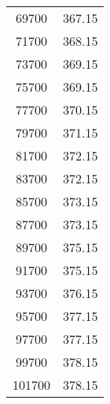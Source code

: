 \begin{longtable}{S S}
         69700  &   367.15 \\
         71700  &   368.15 \\
         73700  &   369.15 \\
         75700  &   369.15 \\
         77700  &   370.15 \\
         79700  &   371.15 \\
         81700  &   372.15 \\
         83700  &   372.15 \\
         85700  &   373.15 \\
         87700  &   373.15 \\
         89700  &   375.15 \\
         91700  &   375.15 \\
         93700  &   376.15 \\
         95700  &   377.15 \\
         97700  &   377.15 \\
         99700  &   378.15 \\
         101700 &   378.15 \\
      \bottomrule
\end{longtable}


